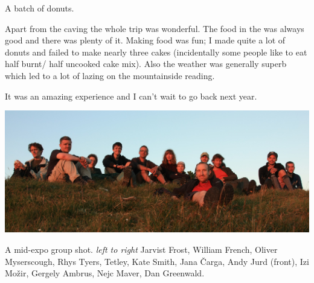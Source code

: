 \begin{marginfigure}
\checkoddpage \ifoddpage \forcerectofloat \else \forceversofloat \fi
\centering
 \caption{A batch of donuts. }
 \label{donuts}
\end{marginfigure}


Apart from the caving the whole trip was wonderful. The food in the  was always good and there was plenty of it. Making food was fun; I made quite a lot of donuts and failed to make nearly three cakes (incidentally some people like to eat half burnt/ half uncooked cake mix). Also the weather was generally superb which led to a lot of lazing on the mountainside reading.

It was an amazing experience and I can’t wait to go back next year.

\begin{pagefigure}
\checkoddpage \ifoddpage \forcerectofloat \else \forceversofloat \fi
   \centering
\includegraphics[width = \textwidth]{2012/alex_pitcher/rhys/2012-08-01-1123-GergelyAmbrus-IMG_2146--orig.jpg}
\caption{A mid-expo group shot. \textit{left to right} Jarvist Frost, William French, Oliver Myserscough, Rhys Tyers, Tetley, Kate Smith, Jana Čarga, Andy Jurd (front), Izi Možir, Gergely Ambrus, Nejc Maver, Dan Greenwald. } \label{group sunset 2012}
\end{pagefigure}